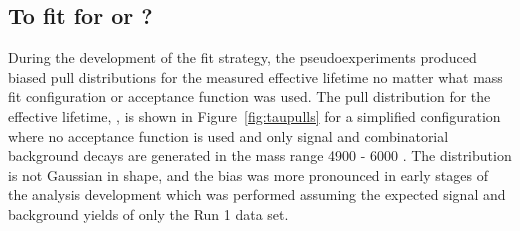 \subsection[To fit for $\tau$ or $\tau^{-1}$?]{To fit for \boldmath{$\tau$} or ?}
\label{sec:tauORinvtau}
During the development of the fit strategy, the pseudoexperiments produced biased pull distributions for the measured \bsmumu effective lifetime no matter what mass fit configuration or acceptance function was used. The pull distribution for the effective lifetime, \tmumu, is shown in Figure~\ref{fig:taupulls} for a simplified configuration where no acceptance function is used and only signal and combinatorial background decays are generated in the mass range 4900 - 6000 \mevcc. The distribution is not Gaussian in shape, and the bias was more pronounced in early stages of the analysis development which was performed assuming the expected signal and background yields of only the Run 1 data set.%


